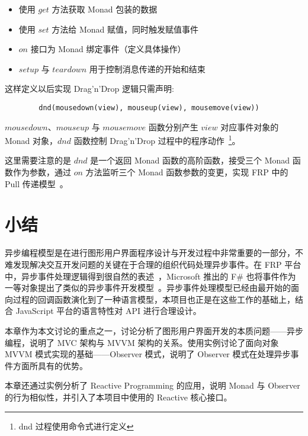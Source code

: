 \begin{itemize}
  \item 使用 $get$ 方法获取 Monad 包装的数据
  \item 使用 $set$ 方法给 Monad 赋值，同时触发赋值事件
  \item $on$ 接口为 Monad 绑定事件（定义具体操作）
  \item $setup$ 与 $teardown$ 用于控制消息传递的开始和结束
\end{itemize}

这样定义以后实现 Drag'n'Drop 逻辑只需声明:

\begin{verbatim}
        dnd(mousedown(view), mouseup(view), mousemove(view))
\end{verbatim}

$mousedown$、$mouseup$ 与 $mousemove$ 函数分别产生 $view$ 对应事件对象的 Monad 对象，$dnd$ 函数控制 Drag'n'Drop 过程中的程序动作~\footnote{dnd 过程使用命令式进行定义}。

这里需要注意的是 $dnd$ 是一个返回 Monad 函数的高阶函数，接受三个 Monad 函数作为参数，通过 $on$ 方法监听三个 Monad 函数参数的变更，实现 FRP 中的 Pull 传递模型~\cite{Elliott:2009:PFR:1596638.1596643}。

\section{小结}

异步编程模型是在进行图形用户界面程序设计与开发过程中非常重要的一部分，不难发现解决交互开发问题的关键在于合理的组织代码处理异步事件。在 FRP 平台中，异步事件处理逻辑得到很自然的表述~\cite{Wan:2002:EF:645772.667941}，Microsoft 推出的 F\# 也将事件作为一等对象提出了类似的异步事件开发模型~\cite{Syme:2011:FAP:1946313.1946334}。异步事件处理模型已经由最开始的面向过程的回调函数演化到了一种语言模型，本项目也正是在这些工作的基础上，结合 JavaScript 平台的语言特性对 API 进行合理设计。

本章作为本文讨论的重点之一，讨论分析了图形用户界面开发的本质问题——异步编程，说明了 MVC 架构与 MVVM 架构的关系。使用实例讨论了面向对象 MVVM 模式实现的基础——Observer 模式，说明了 Observer 模式在处理异步事件方面所具有的优势。

本章还通过实例分析了 Reactive Programming 的应用，说明 Monad 与 Observer 的行为相似性，并引入了本项目中使用的 Reactive 核心接口。

